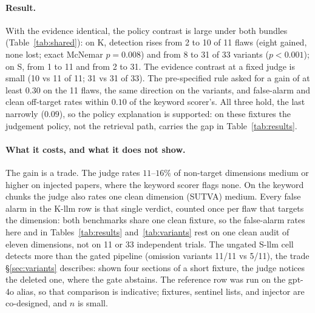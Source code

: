 \paragraph{Result.}
With the evidence identical, the policy contrast is large under both bundles
(Table~\ref{tab:shared}): on K, detection rises from 2 to 10 of 11 flaws (eight
gained, none lost; exact McNemar $p{=}0.008$) and from 8 to 31 of 33 variants
($p{<}0.001$); on S, from 1 to 11 and from 2 to 31. The evidence contrast at a
fixed judge is small (10 vs 11 of 11; 31 vs 31 of 33). The pre-specified rule
asked for a gain of at least $0.30$ on the 11 flaws, the same direction on the
variants, and false-alarm and clean off-target rates within $0.10$ of the
keyword scorer's. All three hold, the last narrowly ($0.09$), so the policy
explanation is supported: on these fixtures the judgement policy, not the
retrieval path, carries the gap in Table~\ref{tab:results}.

\paragraph{What it costs, and what it does not show.}
The gain is a trade. The judge rates $11$--$16\%$ of non-target dimensions
medium or higher on injected papers, where the keyword scorer flags none. On
the keyword chunks
the judge also rates one clean dimension (SUTVA) medium. Every false alarm in
the K-llm row is that single verdict, counted once per flaw that targets the
dimension: both benchmarks share one clean fixture, so the false-alarm rates
here and in Tables~\ref{tab:results} and~\ref{tab:variants} rest on one clean
audit of eleven dimensions, not on 11 or 33 independent trials. The ungated
S-llm cell detects more than the gated pipeline (omission variants 11/11 vs
5/11), the trade \S\ref{sec:variants} describes: shown four sections of a short
fixture, the judge notices the deleted one, where the gate abstains. The
reference row was run on the gpt-4o alias, so that comparison is indicative;
fixtures, sentinel lists, and injector are co-designed, and $n$ is small.

